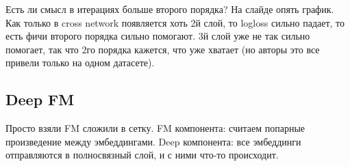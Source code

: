 \documentclass[12pt]{article}
\begin{document}
Есть ли смысл в итерациях больше второго порядка? На слайде опять график. Как только в cross network появляется хоть 2й слой, то logloss сильно падает, то есть фичи второго порядка сильно помогают. 3й слой уже не так сильно помогает, так что 2го порядка кажется, что уже хватает (но авторы это все привели только на одном датасете).

\subsection{Deep FM}

Просто взяли FM  сложили в сетку. FM компонента: считаем попарные произведение между эмбеддингами. Deep компонента: все эмбеддинги отправляются в полносвязный слой, и с ними что-то происходит. 
\end{document}
